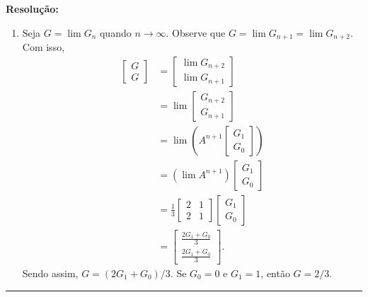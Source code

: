 \documentclass[leqno]{article}
\numberwithin{equation}{section}
\newenvironment{sol} 
{
    \vspace{4mm}
    \noindent\textbf{Resolução:}
    \strut\newline
    \smallskip
    \hspace{-3.5mm} 
} 
{\noindent\rule{4cm}{.1mm}}
\begin{document}
\begin{enumerate}
\begin{sol}
\begin{enumerate}[label=(\alph*)]
        \item Seja \( G = \lim G_{ n } \) quando \( n \to \infty \).
            Observe que \( G = \lim G_{ n+1 } = \lim G_{ n+2 } \).
            Com isso,
            \begin{align*}
                \begin{bmatrix}
                    G \\
                    G
                \end{bmatrix}
                &=
                \begin{bmatrix}
                    \lim G_{ n+2 } \\
                    \lim G_{ n+1 }
                \end{bmatrix} \\
                &= \lim
                \begin{bmatrix}
                    G_{ n+2 } \\
                    G_{ n+1 }
                \end{bmatrix} \\
                &= \lim \left(
                    A^{ n+1 }
                    \begin{bmatrix}
                        G_{ 1 } \\
                        G_{ 0 }
                    \end{bmatrix}
                \right) \\
                &= ( \lim A^{ n+1 } )
                \begin{bmatrix}
                    G_{ 1 } \\
                    G_{ 0 }
                \end{bmatrix} \\
                &= \frac{ 1 }{ 3 }
                \begin{bmatrix}
                    2 & 1 \\
                    2 & 1
                \end{bmatrix}
                \begin{bmatrix}
                    G_{ 1 } \\
                    G_{ 0 }
                \end{bmatrix} \\
                &=
                \begin{bmatrix}
                    \frac{ 2 G_{ 1 } + G_{ 0 } }{ 3 } \\
                    \frac{ 2 G_{ 1 } + G_{ 0 } }{ 3 }
                \end{bmatrix}
            .\end{align*}
            Sendo assim, \( G = ( 2 G_{ 1 } + G_{ 0 } ) / 3 \).
            Se \( G_{ 0 } = 0 \) e \( G_{ 1 } = 1 \), então \( G = 2/3 \).
    \end{enumerate}
    

\end{sol}
\end{enumerate}
\end{document}
